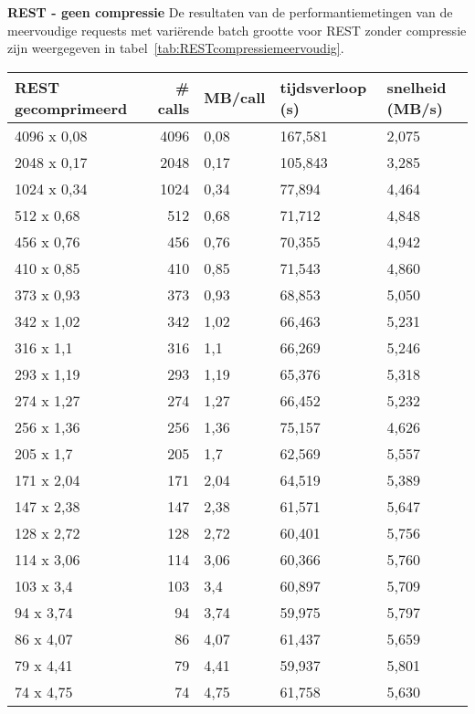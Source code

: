 \textbf{REST - geen compressie}\newline
De resultaten van de performantiemetingen van de meervoudige requests met vari\"erende batch grootte voor REST zonder compressie zijn weergegeven in tabel~\ref{tab:RESTcompressiemeervoudig}.

\begin{table}
    \centering
    \begin{tabular}{lrlll}
        \toprule
        \textbf{REST gecomprimeerd} & \textbf{\# calls} & \textbf{MB/call} & \textbf{tijdsverloop (s)} & \textbf{snelheid (MB/s)} \\
        \midrule
        4096 x 0,08 & 4096 & 0,08 & 167,581 & 2,075 \\
        2048 x 0,17 & 2048 & 0,17 & 105,843 & 3,285 \\
        1024 x 0,34 & 1024 & 0,34 & 77,894 & 4,464 \\
        512 x 0,68 & 512 & 0,68 & 71,712 & 4,848 \\
        456 x 0,76 & 456 & 0,76 & 70,355 & 4,942 \\
        410 x 0,85 & 410 & 0,85 & 71,543 & 4,860 \\
        373 x 0,93 & 373 & 0,93 & 68,853 & 5,050 \\
        342 x 1,02 & 342 & 1,02 & 66,463 & 5,231 \\
        316 x 1,1 & 316 & 1,1 & 66,269 & 5,246 \\
        293 x 1,19 & 293 & 1,19 & 65,376 & 5,318 \\
        274 x 1,27 & 274 & 1,27 & 66,452 & 5,232 \\
        256 x 1,36 & 256 & 1,36 & 75,157 & 4,626 \\
        205 x 1,7 & 205 & 1,7 & 62,569 & 5,557 \\
        171 x 2,04 & 171 & 2,04 & 64,519 & 5,389 \\
        147 x 2,38 & 147 & 2,38 & 61,571 & 5,647 \\
        128 x 2,72 & 128 & 2,72 & 60,401 & 5,756 \\
        114 x 3,06 & 114 & 3,06 & 60,366 & 5,760 \\
        103 x 3,4 & 103 & 3,4 & 60,897 & 5,709 \\
        94 x 3,74 & 94 & 3,74 & 59,975 & 5,797 \\
        86 x 4,07 & 86 & 4,07 & 61,437 & 5,659 \\
        79 x 4,41 & 79 & 4,41 & 59,937 & 5,801 \\
        74 x 4,75 & 74 & 4,75 & 61,758 & 5,630 \\

\end{tabular}
\end{table}
